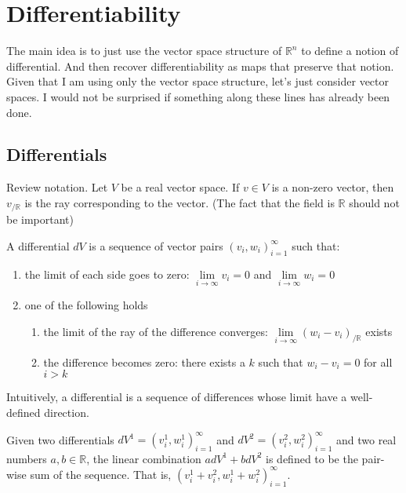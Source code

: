 \chapter{Differentiability}

The main idea is to just use the vector space structure of $\mathbb{R}^n$ to define a notion of differential. And then recover differentiability as maps that preserve that notion. Given that I am using only the vector space structure, let’s just consider vector spaces. I would not be surprised if something along these lines has already been done.

\section{Differentials}

Review notation. Let $V$ be a real vector space. If $v \in V$ is a non-zero vector, then $v_{/ \mathbb{R}}$ is the ray corresponding to the vector. (The fact that the field is $\mathbb{R}$ should not be important)

\begin{defn}
A differential $dV$ is a sequence of vector pairs $(v_i, w_i)_{i=1}^{\infty}$ such that:
\begin{enumerate}
	\item the limit of each side goes to zero: $\lim\limits_{i \to \infty} v_i = 0$ and $\lim\limits_{i \to \infty} w_i = 0$
	\item one of the following holds
	\begin{enumerate}
		\item the limit of the ray of the difference converges: $\lim\limits_{i \to \infty} (w_i - v_i)_{/ \mathbb{R}}$ exists
		\item the difference becomes zero: there exists a $k$ such that $w_i - v_i=0$ for all $i>k$
	\end{enumerate}
\end{enumerate}
Intuitively, a differential is a sequence of differences whose limit have a well-defined direction.
\end{defn}

\begin{defn}
	Given two differentials $dV^1 = (v^1_i, w^1_i)_{i=1}^{\infty}$ and $dV^2 = (v^2_i, w^2_i)_{i=1}^{\infty}$ and two real numbers $a,b \in \mathbb{R}$, the linear combination $a dV^1 + b dV^2$ is defined to be the pair-wise sum of the sequence. That is, $(v^1_i+ v^2_i, w^1_i+ w^2_i)_{i=1}^{\infty}$.
\end{defn}

